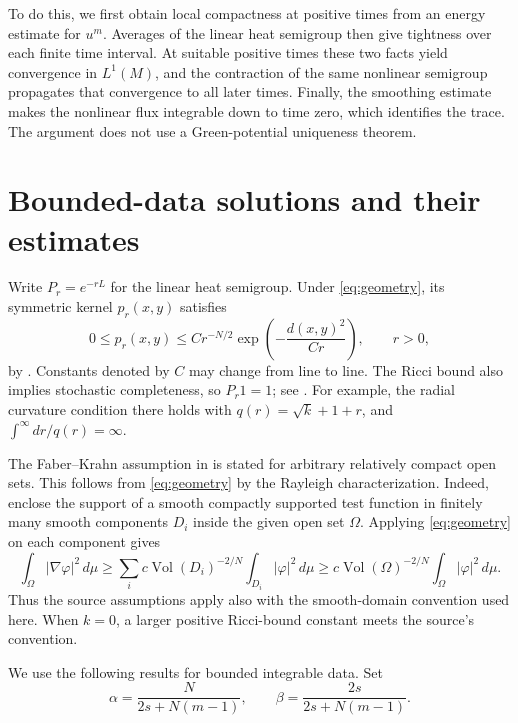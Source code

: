 \documentclass[11pt]{article}
\theoremstyle{remark}
\newcommand{\dd}{\,d\mu}
\DeclareMathOperator{\Vol}{Vol}
\begin{document}
To do this, we first obtain local compactness at positive times from an
energy estimate for $u^m$. Averages of the linear heat semigroup then give
tightness over each finite time interval. At suitable positive times these
two facts yield convergence in $L^1(M)$, and the contraction of the same
nonlinear semigroup propagates that convergence to all later times. Finally,
the smoothing estimate makes the nonlinear flux integrable down to time
zero, which identifies the trace. The argument does not use a Green-potential
uniqueness theorem.

\section{Bounded-data solutions and their estimates}

Write $P_r=e^{-rL}$ for the linear heat semigroup. Under
\eqref{eq:geometry}, its symmetric kernel $p_r(x,y)$ satisfies
\begin{equation}\label{eq:heatkernel}
 0\le p_r(x,y)\le C r^{-N/2}
       \exp\!\left(-\frac{d(x,y)^2}{Cr}\right),\qquad r>0,
\end{equation}
by \cite[Assumption~2.1 and (2.3)]{BBGM}. Constants denoted by $C$ may
change from line to line. The Ricci bound also implies stochastic
completeness, so $P_r1=1$; see \cite[Theorem~15.4(a)]{Gri}. For example,
the radial curvature condition there holds with
$q(r)=\sqrt{k}+1+r$, and $\int^\infty dr/q(r)=\infty$.

The Faber--Krahn assumption in \cite{BBGM} is stated for arbitrary
relatively compact open sets. This follows from \eqref{eq:geometry} by
the Rayleigh characterization. Indeed, enclose the support of a smooth
compactly supported test function in finitely many smooth components
$D_i$ inside the given open set $\Omega$. Applying
\eqref{eq:geometry} on each component gives
\[
 \int_\Omega |\nabla\varphi|^2\dd
 \ge \sum_i c\Vol(D_i)^{-2/N}\int_{D_i}|\varphi|^2\dd
 \ge c\Vol(\Omega)^{-2/N}\int_\Omega|\varphi|^2\dd.
\]
Thus the source assumptions apply also with the smooth-domain convention
used here. When $k=0$, a larger positive Ricci-bound constant meets the
source's convention.

We use the following results for bounded integrable data. Set
\begin{equation}\label{eq:exponents}
 \alpha=\frac{N}{2s+N(m-1)},\qquad
 \beta=\frac{2s}{2s+N(m-1)}.
\end{equation}
\end{document}
